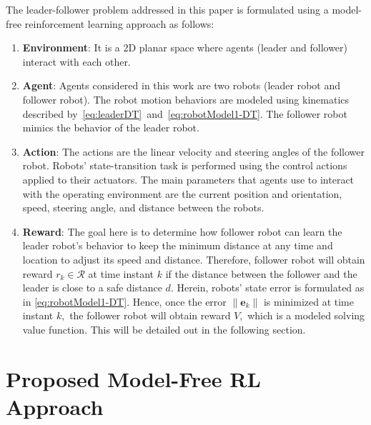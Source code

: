 \documentclass[letterpaper]{article} %
\begin{document}
%
The leader-follower problem addressed in this paper is formulated using a model-free reinforcement learning approach as follows: %
%
%
\begin{enumerate}
    \item \textbf{Environment}: It is a 2D planar space where agents (leader and follower) interact with each other.
    \item \textbf{Agent}: Agents considered in this work are two robots (leader robot and follower robot). The robot motion behaviors are modeled using kinematics described by~\eqref{eq:leaderDT}~and~\eqref{eq:robotModel1-DT}. The follower robot mimics the behavior of the leader robot. %
    \item \textbf{Action}: The actions are the linear velocity and steering angles of the follower robot. Robots' state-transition task is performed using the control actions applied to their actuators. The main parameters that agents use to interact with the operating environment are the current position and orientation, speed, steering angle, and distance between the robots. 
    \item \textbf{Reward}: The goal here is to determine how follower robot can learn the leader robot's behavior to keep the minimum distance at any time and location to adjust its speed and distance. Therefore, follower robot will obtain reward $r_k \in \mathcal{R}$ at time instant $k$ if the distance between the follower and the leader is close to a safe distance $d.$ Herein, robots' state error is formulated as in \eqref{eq:robotModel1-DT}. Hence, once the error $\|\mathbf{e}_k\|$ is minimized at time instant $k,$ the follower robot will obtain reward $V,$ which is a modeled solving value function. This will be detailed out in the following section.
    \end{enumerate}

\section{Proposed Model-Free RL Approach}
\label{sec:RLSolution}
\end{document}

